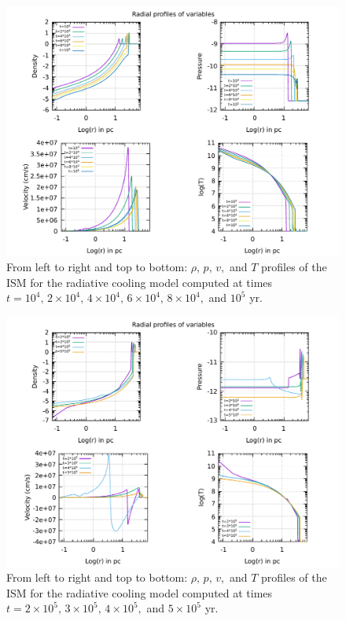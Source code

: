 \documentclass{article}
\begin{document}
\begin{figure}[H]
	\centering
	\includegraphics[width=0.8 \linewidth]{radialprofilescool.pdf}
	\caption{From left to right and top to bottom: $\rho,\,p,\,v,$ and $T$ profiles of the ISM for the radiative cooling model computed at times $t=10^4,\,2\times10^4,\,4\times10^4,\,6\times10^4,\,8\times 10^4,$ and $10^5$ yr.}

	\label{fig:radialprcool}
\end{figure}
\begin{figure}[H]
	\centering
	\includegraphics[width=0.8 \linewidth]{radialprofileshightcool.pdf}
	\caption{From left to right and top to bottom: $\rho,\,p,\,v,$ and $T$ profiles of the ISM for the radiative cooling model computed at times $t=2\times10^5,\,3\times10^5,\,4\times10^5,$ and $5\times10^5$ yr.}


	\label{fig:radialprhightcool}
\end{figure}
\end{document}
